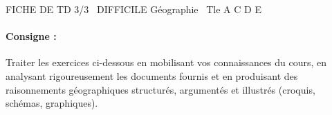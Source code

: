 \documentclass[11pt]{article}
\begin{document}
\begin{tcolorbox}[enhanced,colback=popink,colframe=popink,arc=10pt,boxrule=0pt,left=12pt,right=12pt,top=9pt,bottom=9pt]
{\color{white}\popxbold\small FICHE DE TD 3/3 \textbullet\ DIFFICILE \hfill Géographie \textbullet\ Tle A C D E\par}
\end{tcolorbox}
\vspace{4pt}
\paragraph{Consigne :} Traiter les exercices ci-dessous en mobilisant vos connaissances du cours, en analysant rigoureusement les documents fournis et en produisant des raisonnements géographiques structurés, argumentés et illustrés (croquis, schémas, graphiques).
\end{document}
